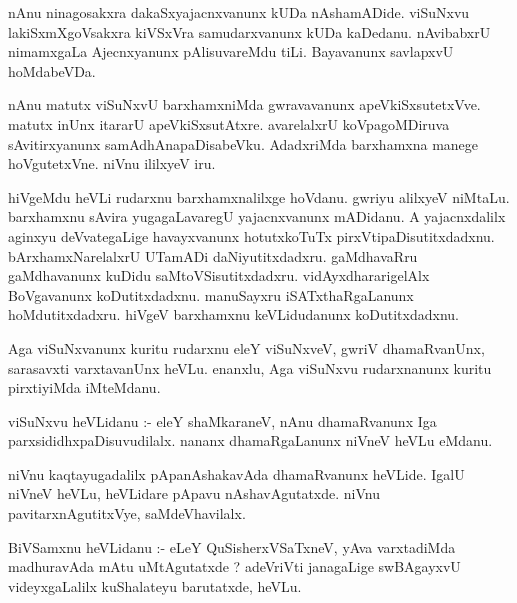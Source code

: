\documentclass{article}
\begin{document}
\begin{mn}
nAnu  ninagosakxra  dakaSxyajacnxvanunx  kUDa  nAshamADide.  viSuNxvu  lakiSxmXgoVsakxra  kiVSxVra samudarxvanunx  
kUDa  kaDedanu.  nAvibabxrU  nimamxgaLa  Ajecnxyanunx  pAlisuvareMdu  tiLi.  Bayavanunx  savlapxvU  hoMdabeVDa.
\end{mn}

\begin{mn}
nAnu  matutx  viSuNxvU  barxhamxniMda  gwravavanunx  apeVkiSxsutetxVve.  matutx  inUnx  itararU  
apeVkiSxsutAtxre.  avarelalxrU  koVpagoMDiruva  sAvitirxyanunx  samAdhAnapaDisabeVku.  AdadxriMda  
barxhamxna  manege  hoVgutetxVne.  niVnu  ililxyeV  iru.
\end{mn}

\begin{mn}
hiVgeMdu  heVLi  rudarxnu  barxhamxnalilxge  hoVdanu.  gwriyu  alilxyeV  niMtaLu.  barxhamxnu  sAvira  
yugagaLavaregU  yajacnxvanunx  mADidanu.  A  yajacnxdalilx  aginxyu  deVvategaLige  havayxvanunx  
hotutxkoTuTx  pirxVtipaDisutitxdadxnu.  bArxhamxNarelalxrU  UTamADi  daNiyutitxdadxru.  gaMdhavaRru  
gaMdhavanunx  kuDidu  saMtoVSisutitxdadxru.  vidAyxdhararigelAlx  BoVgavanunx  koDutitxdadxnu.  
manuSayxru  iSATxthaRgaLanunx  hoMdutitxdadxru.  hiVgeV  barxhamxnu  keVLidudanunx  koDutitxdadxnu. 
\end{mn}

\begin{mn}
Aga  viSuNxvanunx  kuritu  rudarxnu  eleY  viSuNxveV,  gwriV  dhamaRvanUnx,  sarasavxti  varxtavanUnx  
heVLu.  enanxlu,  Aga  viSuNxvu  rudarxnanunx  kuritu  pirxtiyiMda  iMteMdanu.
\end{mn}

\begin{mn}
viSuNxvu  heVLidanu :- eleY  shaMkaraneV,  nAnu  dhamaRvanunx  Iga  parxsididhxpaDisuvudilalx.  nananx  
dhamaRgaLanunx  niVneV  heVLu  eMdanu.
\end{mn}

\begin{mn}
niVnu  kaqtayugadalilx  pApanAshakavAda  dhamaRvanunx  heVLide.  IgalU  niVneV  heVLu,  heVLidare  pApavu  
nAshavAgutatxde.  niVnu  pavitarxnAgutitxVye,  saMdeVhavilalx.
\end{mn}

\begin{mn}
BiVSamxnu  heVLidanu :- eLeY  QuSisherxVSaTxneV,  yAva  varxtadiMda  madhuravAda  mAtu  uMtAgutatxde ?  
adeVriVti  janagaLige  swBAgayxvU  videyxgaLalilx  kuShalateyu  barutatxde,  heVLu.
\end{mn}
\end{document}
